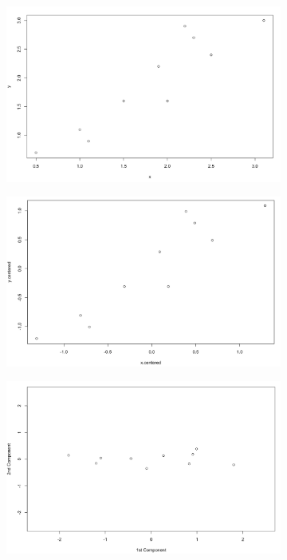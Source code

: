 \documentclass[11pt, oneside]{article}   	%
\begin{document}
\begin{figure}[!ht]
	\centering
	\begin{subfigure}{.45\textwidth}
		\includegraphics[width=\textwidth]{example1-plot-two-genes}
		\caption{}
		\label{fig:PlotTwoGenes}
	\end{subfigure}
	\begin{subfigure}{0.45\textwidth}
		\includegraphics[width=\textwidth]{example1-plot-two-genes-centered}
		\caption{}
		\label{fig:PlotTwoGenesCentered}
	\end{subfigure}
	\begin{subfigure}{0.45\textwidth}
		\includegraphics[width=\textwidth]{example1_plot_2PC}

\end{subfigure}
\end{figure}
\end{document}
